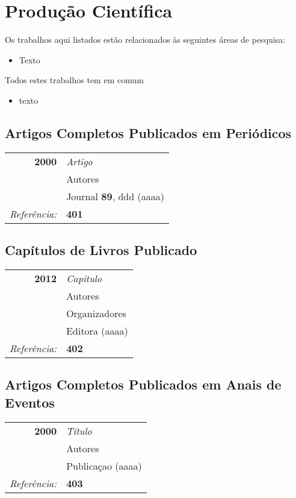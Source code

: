 \chapter{Produção Científica}
Os trabalhos aqui listados estão relacionados às seguintes áreas de pesquisa:

\begin{itemize}
    \item Texto

\end{itemize}
Todos estes trabalhos tem em comum

\begin{itemize}
    \item texto
\end{itemize}


\section{Artigos Completos Publicados em Periódicos}

\begin{center}
\begin{tabular}[t]{rl}
\textbf{2000} & \textit{Artigo}\\
              &  Autores\\
              & Journal \textbf{89}, ddd (aaaa) \\
\textit{Referência:} & \textbf{401} \\
\end{tabular}
\end{center}


\section{Capítulos de Livros Publicado}\label{livro}
\begin{center}
\begin{tabular}[t]{rl}
\textbf{2012} & \textit{Capitulo} \\
              & Autores\\
              & Organizadores\\
              & Editora (aaaa)\\
\textit{Referência:} & \textbf{402} \\
\end{tabular}
\end{center}

\section{Artigos Completos Publicados em Anais de Eventos}

\begin{center}
\begin{tabular}[t]{rl}
\textbf{2000} & \textit{Título }\\
              &  Autores\\
              & Publicaçao (aaaa) \\
\textit{Referência:} & \textbf{403} \\

              

\end{tabular}
\end{center}
